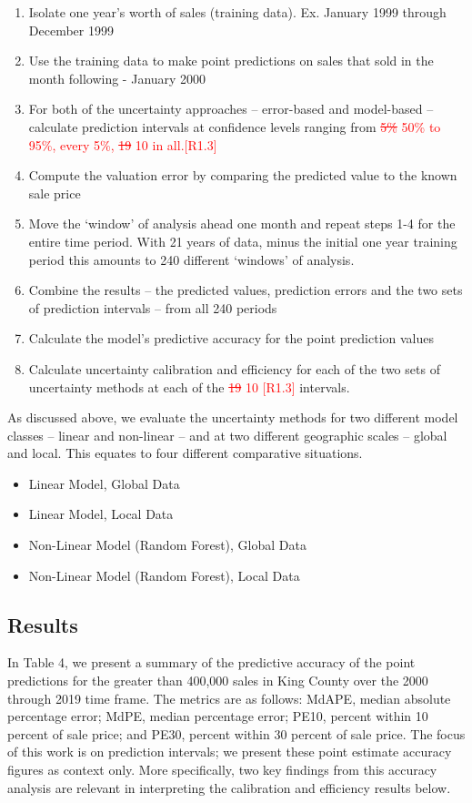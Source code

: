 \documentclass[colTwo]{anon}
\theoremstyle{definition}
\begin{document}
\begin{enumerate}
\item Isolate one year’s worth of sales (training data). Ex. January 1999 through December 1999
\item Use the training data to make point predictions on sales that sold in the month following - January 2000
\item For both of the uncertainty approaches -- error-based and model-based -- calculate prediction intervals at confidence levels ranging from \textcolor{red}{\st{5\%} 50\% to 95\%, every 5\%, \st{19} 10 in all.[R1.3]} 
\item Compute the valuation error by comparing the predicted value to the known sale price
\item Move the ‘window’ of analysis ahead one month and repeat steps 1-4 for the entire time period.  With 21 years of data, minus the initial one year training period this amounts to 240 different ‘windows’ of analysis.
\item Combine the results -- the predicted values, prediction errors and the two sets of prediction intervals -- from all 240 periods
\item Calculate the model’s predictive accuracy for the point prediction values
\item Calculate uncertainty calibration and efficiency for each of the two sets of uncertainty methods at each of the \textcolor{red}{\st{19} 10 [R1.3]} intervals.
\end{enumerate}

As discussed above, we evaluate the uncertainty methods for two different model classes -- linear and non-linear -- and at two different geographic scales -- global and local.  This equates to four different comparative situations. 

\begin{itemize}
\item Linear Model, Global Data
\item Linear Model, Local Data
\item Non-Linear Model (Random Forest), Global Data
\item Non-Linear Model (Random Forest), Local Data
\end{itemize}

\subsection{Results}

In Table 4, we present a summary of the predictive accuracy of the point predictions for the greater than 400,000 sales in King County over the 2000 through 2019 time frame. The metrics are as follows: MdAPE, median absolute percentage error; MdPE, median percentage error; PE10, percent within 10 percent of sale price; and PE30, percent within 30 percent of sale price.  The focus of this work is on prediction intervals; we present these point estimate accuracy figures as context only.  More specifically, two key findings from this accuracy analysis are relevant in interpreting the calibration and efficiency results below. 
\end{document}
